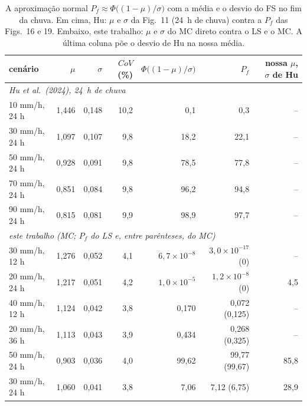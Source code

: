 \begin{table}[htbp]\centering\footnotesize
\caption{A aproximação normal $P_f \approx \Phi\bigl((1 - \mu)/\sigma\bigr)$ com a média e o desvio do FS no fim da chuva. Em cima, Hu: $\mu$ e $\sigma$ da Fig.~11 (24~h de chuva) contra a $P_f$ das Figs.~16 e 19. Embaixo, este trabalho: $\mu$ e $\sigma$ do MC direto contra o LS e o MC. A última coluna põe o desvio de Hu na nossa média.}\label{tab:normal}
\begin{tabular}{lrrrrrr}\toprule
cenário & $\mu$ & $\sigma$ & $CoV$ (\%) & $\Phi\bigl((1 - \mu)/\sigma\bigr)$ & $P_f$ & nossa $\mu$, $\sigma$ de Hu \\\midrule
\multicolumn{7}{l}{\textit{Hu et al.\ (2024), 24~h de chuva}} \\
10 mm/h, 24 h & 1{,}446 & 0{,}148 & 10{,}2 & 0{,}1 & 0{,}3 & -- \\
30 mm/h, 24 h & 1{,}097 & 0{,}107 & 9{,}8 & 18{,}2 & 22{,}1 & -- \\
50 mm/h, 24 h & 0{,}928 & 0{,}091 & 9{,}8 & 78{,}5 & 77{,}8 & -- \\
70 mm/h, 24 h & 0{,}851 & 0{,}084 & 9{,}8 & 96{,}2 & 94{,}8 & -- \\
90 mm/h, 24 h & 0{,}815 & 0{,}081 & 9{,}9 & 98{,}9 & 97{,}7 & -- \\
\midrule\multicolumn{7}{l}{\textit{este trabalho (MC; $P_f$ do LS e, entre parênteses, do MC)}} \\
30 mm/h, 12 h & 1{,}276 & 0{,}052 & 4{,}1 & $6{,}7\times 10^{-8}$ & $3{,}0\times 10^{-17}$ (0) & -- \\
20 mm/h, 24 h & 1{,}217 & 0{,}051 & 4{,}2 & $1{,}0\times 10^{-5}$ & $1{,}2\times 10^{-8}$ (0) & 4{,}5 \\
40 mm/h, 12 h & 1{,}124 & 0{,}042 & 3{,}8 & 0{,}170 & 0{,}072 (0{,}125) & -- \\
20 mm/h, 36 h & 1{,}113 & 0{,}043 & 3{,}9 & 0{,}434 & 0{,}268 (0{,}325) & -- \\
50 mm/h, 24 h & 0{,}903 & 0{,}036 & 4{,}0 & 99{,}62 & 99{,}77 (99{,}67) & 85{,}8 \\
30 mm/h, 24 h & 1{,}060 & 0{,}041 & 3{,}8 & 7{,}06 & 7{,}12 (6{,}75) & 28{,}9 \\
\bottomrule\end{tabular}\end{table}
